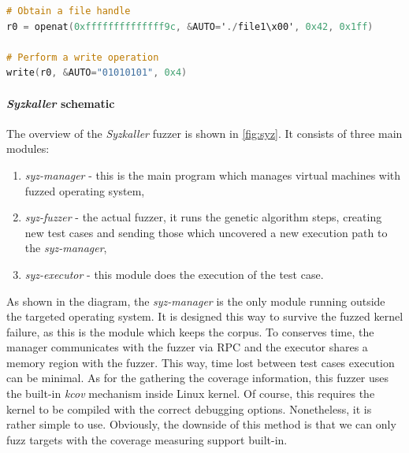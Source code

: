\begin{minipage}\linewidth
    \begin{lstlisting}[language=C,caption={\textit{Syzkaller} DSL describing syscalls \cite{syzkaller_repo}},captionpos=b,label={syzkaller_dsl}]
# Obtain a file handle
r0 = openat(0xffffffffffffff9c, &AUTO='./file1\x00', 0x42, 0x1ff)

# Perform a write operation
write(r0, &AUTO="01010101", 0x4)
    \end{lstlisting} 
\end{minipage}

\paragraph{\textit{Syzkaller} schematic}

The overview of the \textit{Syzkaller} fuzzer is shown in \ref{fig:syz}. It consists of three main modules:
\begin{enumerate}
    \item \textit{syz-manager} - this is the main program which manages virtual machines with fuzzed operating system,
    \item \textit{syz-fuzzer} - the actual fuzzer, it runs the genetic algorithm steps, creating new test cases and sending those which uncovered a new execution path to the \textit{syz-manager},
    \item \textit{syz-executor} - this module does the execution of the test case.
\end{enumerate}
As shown in the diagram, the \textit{syz-manager} is the only module running outside the targeted operating system. It is designed this way to survive the fuzzed kernel failure, as this is the module which keeps the corpus. To conserves time, the manager communicates with the fuzzer via RPC and the executor shares a memory region with the fuzzer. This way, time lost between test cases execution can be minimal. As for the gathering the coverage information, this fuzzer uses the built-in \textit{kcov} mechanism inside Linux kernel. Of course, this requires the kernel to be compiled with the correct debugging options. Nonetheless, it is rather simple to use. Obviously, the downside of this method is that we can only fuzz targets with the coverage measuring support built-in.

